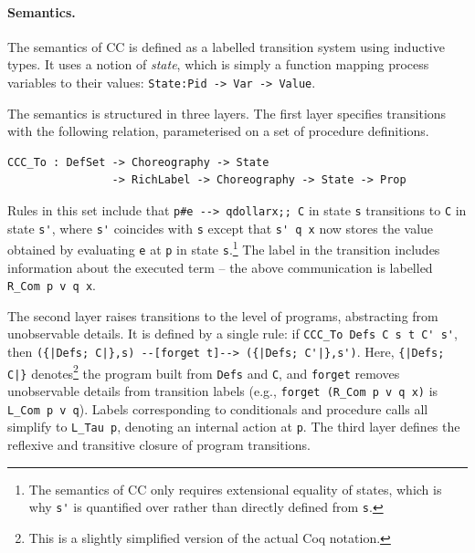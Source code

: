 \documentclass[runningheads]{llncs}
\begin{document}
\paragraph{Semantics.}
The semantics of CC is defined as a labelled transition system using inductive types.
It uses a notion of \emph{state}, which is simply a function mapping process variables to their values: \lstinline+State:Pid -> Var -> Value+.

The semantics is structured in three layers.
The first layer specifies transitions with the following relation, parameterised on a
set of procedure definitions.
\begin{lstlisting}
CCC_To : DefSet -> Choreography -> State
				-> RichLabel -> Choreography -> State -> Prop
\end{lstlisting}
Rules in this set include that \lstinline+p#e --> qdollarx;; C+ in state \lstinline+s+
transitions to \lstinline+C+ in state \lstinline+s'+, where \lstinline+s'+ coincides with \lstinline+s+
except that \lstinline+s' q x+ now stores the value obtained by evaluating \lstinline+e+
at \lstinline+p+ in state \lstinline+s+.\footnote{The semantics of CC only requires extensional equality of states, which is why \lstinline+s'+ is quantified over rather than directly defined from \lstinline+s+.}
The label in the transition includes information about the executed term -- the above
communication is labelled \lstinline+R_Com p v q x+.


The second layer raises transitions to the level of programs, abstracting from 
unobservable details.
It is defined by a single rule: if \lstinline+CCC_To Defs C s t C' s'+, then
\lstinline+({|Defs; C|},s) --[forget t]--> ({|Defs; C'|},s')+.
Here, \lstinline+{|Defs; C|}+ denotes\footnote{This is a slightly simplified version of the actual Coq notation.} the program built from \lstinline+Defs+ and \lstinline+C+, and
\lstinline+forget+ removes unobservable details from transition labels (e.g.,
\lstinline+forget (R_Com p v q x)+ is \lstinline+L_Com p v q+).
Labels corresponding to conditionals and procedure calls all simplify to
\lstinline+L_Tau p+, denoting an internal action at \lstinline+p+.
% 
The third layer defines the reflexive and transitive closure of program transitions.
\end{document}
